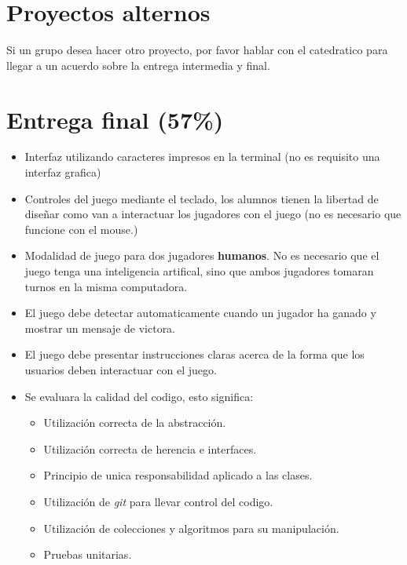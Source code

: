 \documentclass{article}
\begin{document}
\section*{Proyectos alternos}
Si un grupo desea hacer otro proyecto, por favor hablar con el
catedratico para llegar a un acuerdo sobre la entrega intermedia y
final.

\section*{Entrega final (57\%)}
\begin{itemize}
        \item{Interfaz utilizando caracteres impresos en la terminal
        (no es requisito una interfaz grafica)}
        \item{Controles del juego mediante el teclado, los alumnos
        tienen la libertad de dise\~nar como van a interactuar
        los jugadores con el juego (no es necesario que funcione con
        el mouse.)}
        \item{Modalidad de juego para dos jugadores {\bf humanos}. No
        es necesario que el juego tenga una inteligencia artifical,
        sino que ambos jugadores tomaran turnos en la misma computadora.}
        \item{El juego debe detectar automaticamente cuando un jugador
        ha ganado y mostrar un mensaje de victora.}
        \item{El juego debe presentar instrucciones claras acerca
        de la forma que los usuarios deben interactuar con el juego.}
        \item{Se evaluara la calidad del codigo, esto significa:
        \begin{itemize}
                \item{Utilizaci\'on correcta de la abstracci\'on.}
                \item{Utilizaci\'on correcta de herencia e interfaces.}
                \item{Principio de unica responsabilidad aplicado a las clases.}
                \item{Utilizaci\'on de \emph{git} para llevar control del codigo.}
                \item{Utilizaci\'on de colecciones y algoritmos para su manipulaci\'on.}
                \item{Pruebas unitarias.}
        \end{itemize}
        }
\end{itemize}
\end{document}
